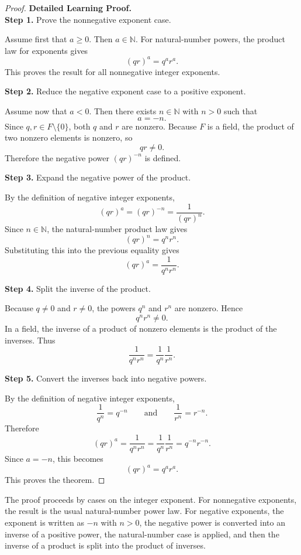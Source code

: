 \begin{proof}
\textbf{Detailed Learning Proof.}~\\

\textbf{Step 1.} Prove the nonnegative exponent case.

Assume first that $a\ge 0$. Then $a\in\mathbb{N}$. For natural-number
powers, the product law for exponents gives
\[
(qr)^a=q^a r^a.
\]
This proves the result for all nonnegative integer exponents.

\textbf{Step 2.} Reduce the negative exponent case to a positive exponent.

Assume now that $a<0$. Then there exists $n\in\mathbb{N}$ with
$n>0$ such that
\[
a=-n.
\]
Since $q,r\in F\setminus\{0\}$, both $q$ and $r$ are nonzero. Because
$F$ is a field, the product of two nonzero elements is nonzero, so
\[
qr\neq 0.
\]
Therefore the negative power $(qr)^{-n}$ is defined.

\textbf{Step 3.} Expand the negative power of the product.

By the definition of negative integer exponents,
\[
(qr)^a=(qr)^{-n}=\frac{1}{(qr)^n}.
\]
Since $n\in\mathbb{N}$, the natural-number product law gives
\[
(qr)^n=q^n r^n.
\]
Substituting this into the previous equality gives
\[
(qr)^a=\frac{1}{q^n r^n}.
\]

\textbf{Step 4.} Split the inverse of the product.

Because $q\neq 0$ and $r\neq 0$, the powers $q^n$ and $r^n$ are
nonzero. Hence
\[
q^n r^n\neq 0.
\]
In a field, the inverse of a product of nonzero elements is the product
of the inverses. Thus
\[
\frac{1}{q^n r^n}=\frac{1}{q^n}\frac{1}{r^n}.
\]

\textbf{Step 5.} Convert the inverses back into negative powers.

By the definition of negative integer exponents,
\[
\frac{1}{q^n}=q^{-n}
\qquad\text{and}\qquad
\frac{1}{r^n}=r^{-n}.
\]
Therefore
\[
(qr)^a
=
\frac{1}{q^n r^n}
=
\frac{1}{q^n}\frac{1}{r^n}
=
q^{-n}r^{-n}.
\]
Since $a=-n$, this becomes
\[
(qr)^a=q^a r^a.
\]
This proves the theorem.
\end{proof}

\begin{remark*}
The proof proceeds by cases on the integer exponent. For nonnegative
exponents, the result is the usual natural-number power law. For negative
exponents, the exponent is written as $-n$ with $n>0$, the negative
power is converted into an inverse of a positive power, the natural-number
case is applied, and then the inverse of a product is split into the product
of inverses.
\end{remark*}


